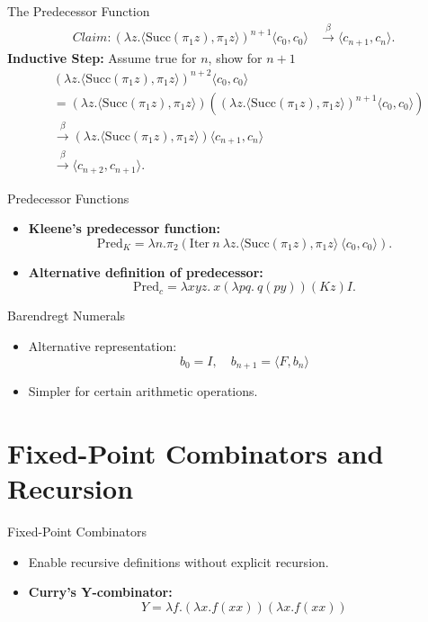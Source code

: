 \documentclass{beamer}
\begin{document}
\begin{frame}{The Predecessor Function}
  \begin{align*}Claim:
    (\lambda z. \langle \text{Succ}(\pi_1 z), \pi_1 z \rangle)^{n+1} \langle c_0, c_0 \rangle &\xrightarrow{\beta} \langle c_{n+1}, c_n \rangle.
  \end{align*}
  \textbf{Inductive Step:} Assume true for \(n\), show for \(n+1\)\\
  \[
  \begin{aligned}
    &(\lambda z. \langle \text{Succ}(\pi_1 z), \pi_1 z \rangle)^{n+2} \langle c_0, c_0 \rangle \\
    &= (\lambda z. \langle \text{Succ}(\pi_1 z), \pi_1 z \rangle)((\lambda z. \langle \text{Succ}(\pi_1 z), \pi_1 z \rangle)^{n+1} \langle c_0, c_0 \rangle) \\
    &\xrightarrow{\beta} (\lambda z. \langle \text{Succ}(\pi_1 z), \pi_1 z \rangle) \langle c_{n+1}, c_n \rangle \\
    &\xrightarrow{\beta} \langle c_{n+2}, c_{n+1} \rangle.
  \end{aligned}
  \]
\end{frame}
\begin{frame}{Predecessor Functions}
  \begin{itemize}
    \item \textbf{Kleene's predecessor function:}
      \[
      \text{Pred}_K = \lambda n. \pi_2 (\text{Iter} \ n \ \lambda z. \langle \text{Succ}(\pi_1 z), \pi_1 z \rangle \ \langle c_0, c_0 \rangle).
      \]
  
    \item \textbf{Alternative definition of predecessor:}
      \[
      \text{Pred}_c = \lambda x y z.\ x(\lambda p q.\ q(p y)) (K z) I.
      \]
  \end{itemize}
\end{frame}
\begin{frame}{Barendregt Numerals}
  \begin{itemize}
    
    \item Alternative representation: 
      \[
      b_0 = I,\quad b_{n+1} = \langle F, b_n \rangle
      \]
    \item Simpler for certain arithmetic operations.
  \end{itemize}
\end{frame}

\section{Fixed-Point Combinators and Recursion}
\begin{frame}{Fixed-Point Combinators}
  \begin{itemize}
    \item Enable recursive definitions without explicit recursion.
    \item \textbf{Curry's Y-combinator:}
      \[
      Y = \lambda f. (\lambda x. f (x x)) (\lambda x. f (x x))
      \]
  \end{itemize}
\end{frame}
\end{document}
